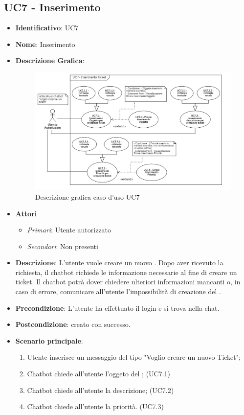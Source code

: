 \subsection{UC7 - Inserimento }
\begin{itemize}
	\item \textbf{Identificativo}: UC7
	\item \textbf{Nome}: Inserimento 
	\item\textbf{Descrizione Grafica}: 
	

	\begin{figure}[h]
        \centering
        \includegraphics[scale=0.80]{images/UC7.png} 
        \caption{Descrizione grafica caso d'uso UC7}
    \end{figure}

	\item \textbf{Attori}
	\begin{itemize} 
		\item \textit{Primari}: Utente autorizzato
		\item \textit{Secondari}: Non presenti 
	\end{itemize}
	\item \textbf{Descrizione}: L'utente vuole creare un nuovo . Dopo aver ricevuto la richiesta, il chatbot richiede le informazione necessarie al fine di creare un ticket. Il chatbot potrà dover chiedere ulteriori informazioni mancanti o, in caso di errore, comunicare all'utente l'impossibilità di creazione del .
	\item \textbf{Precondizione}: L'utente ha effettuato il login e si trova nella chat.
	\item \textbf{Postcondizione}:  creato con successo.
	\item \textbf{Scenario principale}: \begin{enumerate}
		\item Utente inserisce un messaggio del tipo "Voglio creare un nuovo Ticket";
		\item Chatbot chiede all'utente l'oggeto del ; (UC7.1)
    \item Chatbot chiede all'utente la descrizione; (UC7.2)
		\item Chatbot chiede all'utente la priorità. (UC7.3)
	\end{enumerate}
\end{itemize}


